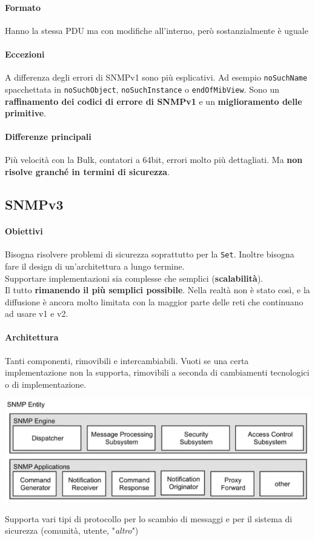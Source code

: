 \documentclass[10pt]{book}
\begin{document}
\paragraph{Formato} Hanno la stessa PDU ma con modifiche all'interno, però sostanzialmente è uguale
\paragraph{Eccezioni} A differenza degli errori di SNMPv1 sono più esplicativi. Ad esempio \texttt{noSuchName} spacchettata in \texttt{noSuchObject}, \texttt{noSuchInstance} o \texttt{endOfMibView}. Sono un \textbf{raffinamento dei codici di errore di SNMPv1} e un \textbf{miglioramento delle primitive}.
\paragraph{Differenze principali} Più velocità con la Bulk, contatori a 64bit, errori molto più dettagliati. Ma \textbf{non risolve granché in termini di sicurezza}.
\subsection{SNMPv3}
\paragraph{Obiettivi} Bisogna risolvere problemi di sicurezza soprattutto per la \texttt{Set}. Inoltre bisogna fare il design di un'architettura a lungo termine.\\
Supportare implementazioni sia complesse che semplici (\textbf{scalabilità}).\\
Il tutto \textbf{rimanendo il più semplici possibile}. Nella realtà non è stato così, e la diffusione è ancora molto limitata con la maggior parte delle reti che continuano ad usare v1 e v2.
\paragraph{Architettura} Tanti componenti, rimovibili e intercambiabili. Vuoti se una certa implementazione non la supporta, rimovibili a seconda di cambiamenti tecnologici o di implementazione.
\begin{center}
	\includegraphics[scale=0.75]{snmp3.png}
\end{center}
Supporta vari tipi di protocollo per lo scambio di messaggi e per il sistema di sicurezza (comunità, utente, "\textit{altro}")
\end{document}
